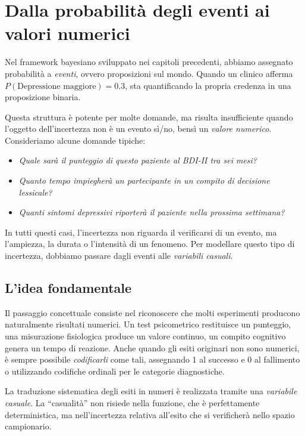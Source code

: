 \documentclass[
  italian,
  letterpaper,
  a4paper,
  11pt,
  open=any]{scrbook}
\providecommand{\tightlist}{%
  \setlength{\itemsep}{0pt}\setlength{\parskip}{0pt}}
\theoremstyle{plain}
\theoremstyle{definition}
\theoremstyle{definition}
\theoremstyle{remark}
\begin{document}
\section{Dalla probabilità degli eventi ai valori
numerici}\label{sec-from-events-to-numbers}

Nel framework bayesiano sviluppato nei capitoli precedenti, abbiamo
assegnato probabilità a \emph{eventi}, ovvero proposizioni sul mondo.
Quando un clinico afferma \(P(\text{Depressione maggiore}) = 0.3\), sta
quantificando la propria credenza in una proposizione binaria.

Questa struttura è potente per molte domande, ma risulta insufficiente
quando l'oggetto dell'incertezza non è un evento sì/no, bensì un
\emph{valore numerico}. Consideriamo alcune domande tipiche:

\begin{itemize}
\tightlist
\item
  \emph{Quale sarà il punteggio di questo paziente al BDI-II tra sei
  mesi?}
\item
  \emph{Quanto tempo impiegherà un partecipante in un compito di
  decisione lessicale?}
\item
  \emph{Quanti sintomi depressivi riporterà il paziente nella prossima
  settimana?}
\end{itemize}

In tutti questi casi, l'incertezza non riguarda il verificarsi di un
evento, ma l'ampiezza, la durata o l'intensità di un fenomeno. Per
modellare questo tipo di incertezza, dobbiamo passare dagli eventi alle
\emph{variabili casuali}.

\subsection{L'idea fondamentale}\label{lidea-fondamentale}

Il passaggio concettuale consiste nel riconoscere che molti esperimenti
producono naturalmente risultati numerici. Un test psicometrico
restituisce un punteggio, una misurazione fisiologica produce un valore
continuo, un compito cognitivo genera un tempo di reazione. Anche quando
gli esiti originari non sono numerici, è sempre possibile
\emph{codificarli} come tali, assegnando 1 al successo e 0 al fallimento
o utilizzando codifiche ordinali per le categorie diagnostiche.

La traduzione sistematica degli esiti in numeri è realizzata tramite una
\emph{variabile casuale}. La ``casualità'' non risiede nella funzione,
che è perfettamente deterministica, ma nell'incertezza relativa
all'esito che si verificherà nello spazio campionario.
\end{document}

